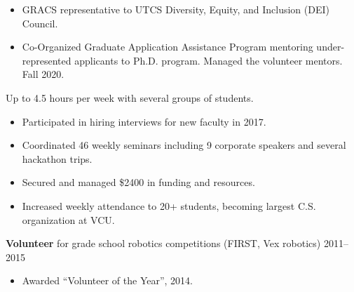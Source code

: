 \documentclass[11pt,letterpaper,serif]{moderncv}
\begin{document}
{
	\begin{adjustwidth}{.25in}{}
		\begin{itemize}
			\item GRACS representative to UTCS Diversity, Equity, and Inclusion (DEI) Council.
			\item Co-Organized Graduate Application Assistance Program mentoring under-represented applicants to Ph.D. program. Managed the volunteer mentors. Fall 2020.
		\end{itemize}
	\end{adjustwidth}
}

{
	\begin{adjustwidth}{.25in}{}
		Up to 4.5 hours per week with several groups of students.
	\end{adjustwidth}
}

{
	\begin{adjustwidth}{.25in}{}
		\begin{itemize}
			\item Participated in hiring interviews for new faculty in 2017.
		\end{itemize}
	\end{adjustwidth}
}

{
	\begin{adjustwidth}{.25in}{}
		\begin{itemize}
			\item Coordinated 46 weekly seminars including 9 corporate speakers and several hackathon trips.
			\item Secured and managed \$2400 in funding and resources.
			\item Increased weekly attendance to 20+ students, becoming largest C.S. organization at VCU.
		\end{itemize}
	\end{adjustwidth}
}


{\textbf{Volunteer} for grade school robotics competitions (FIRST, Vex robotics)}
{2011--2015}{}
{
	\begin{adjustwidth}{.25in}{}
		\begin{itemize}
			\item Awarded ``Volunteer of the Year'', 2014.
		\end{itemize}
	\end{adjustwidth}
}
\end{document}
